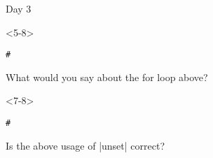 \begin{frame}[fragile]{Day 3}
\begin{onlyenv}
\begin{uncoverenv}
            \end{uncoverenv}
    \end{onlyenv}
    \begin{onlyenv}<5-8>
        \begin{lstlisting}[style=myBash, numbers=none]
            #
        \end{lstlisting}
        \begin{quiz}[5]{What would you say about the for loop above?}
            \wrongChoice{}
            \correctChoice{}
            \wrongChoice{}
        \end{quiz}
        \begin{uncoverenv}<7-8>
            \begin{lstlisting}[style=myBash, numbers=none]
                #
            \end{lstlisting}
            \begin{quiz}[7]{Is the above usage of \bash|unset| correct?}
                \correctChoice{}
                \wrongChoice{}
                \wrongChoice{}
            \end{quiz}
        \end{uncoverenv}
    \end{onlyenv}
\end{frame}
